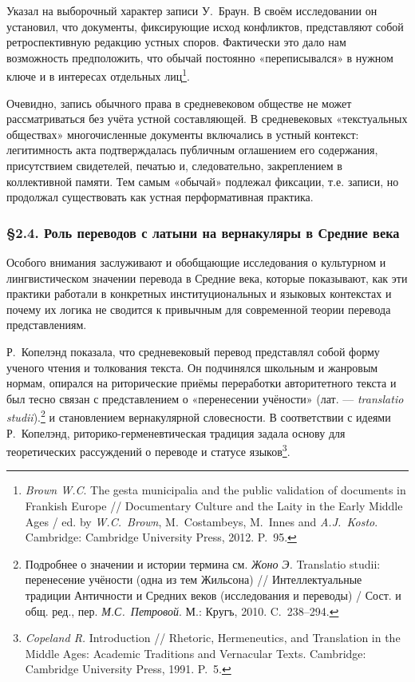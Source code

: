 Указал на выборочный характер записи У.~Браун. В своём исследовании он установил, что документы, фиксирующие исход конфликтов, представляют собой ретроспективную редакцию устных споров. Фактически это дало нам возможность предположить, что обычай постоянно «переписывался» в нужном ключе и в интересах отдельных лиц\footnote{\emph{Brown W.C}. The gesta municipalia and the public validation of documents in Frankish Europe // Documentary Culture and the Laity in the Early Middle Ages / ed. by \emph{W.C.~Brown}, M.~Costambeys, M.~Innes and \emph{A.J.~Kosto}. Cambridge: Cambridge University Press, 2012. P.~95.}.

Очевидно, запись обычного права в средневековом обществе не может рассматриваться без учёта устной составляющей. В средневековых «текстуальных обществах» многочисленные документы включались в устный контекст: легитимность акта подтверждалась публичным оглашением его содержания, присутствием свидетелей, печатью и, следовательно, закреплением в коллективной памяти. Тем самым «обычай» подлежал фиксации, т.е. записи, но продолжал существовать как устная перформативная практика.

\subsubsection*{§2.4. Роль переводов с латыни на вернакуляры в Средние века}

Особого внимания заслуживают и обобщающие исследования о культурном и лингвистическом значении перевода в Средние века, которые показывают, как эти практики работали в конкретных институциональных и языковых контекстах и почему их логика не сводится к привычным для современной теории перевода представлениям.

Р.~Копелэнд показала, что средневековый перевод представлял собой форму ученого чтения и толкования текста. Он подчинялся школьным и жанровым нормам, опирался на риторические приёмы переработки авторитетного текста и был тесно связан с представлением о «перенесении учёности» (лат. --- \emph{translatio}\emph{ }\emph{studii}).\footnote{Подробнее о значении и истории термина см. \emph{Жоно}\emph{ Э. }Translatio studii: перенесение учёности (одна из тем Жильсона) // Интеллектуальные традиции Античности и Средних веков (исследования и переводы) / Сост. и общ. ред., пер. \emph{М.С.~Петровой}. М.: Кругъ, 2010. C.~238--294.} и становлением вернакулярной словесности. В соответствии с идеями Р.~Копелэнд, риторико-герменевтическая традиция задала основу для теоретических рассуждений о переводе и статусе языков\footnote{\emph{Copeland R.} Introduction // Rhetoric, Hermeneutics, and Translation in the Middle Ages: Academic Traditions and Vernacular Texts. Cambridge: Cambridge University Press, 1991. P.~5.}.

